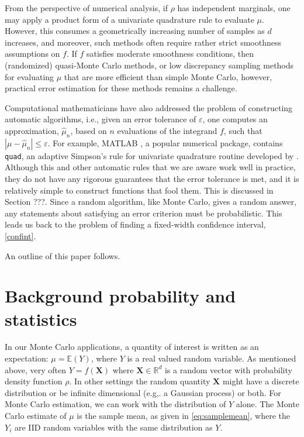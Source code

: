 \documentclass[graybox]{svmult}
\newcommand\real{\mathbb{R}}
\newcommand\e{\mathbb{E}}
\newcommand{\bsX}{\boldsymbol{X}}
\newcommand{\abs}[1]{\left|#1\right|}
\newcommand{\hmu}{\hat{\mu}}
\def\abs#1{\ensuremath{\left \lvert #1 \right \rvert}}
\begin{document}
From the perspective of numerical analysis, if $\rho$ has independent marginals, one may apply a product form of a univariate quadrature rule to evaluate $\mu$.  However, this consumes a geometrically increasing number of samples as $d$ increases, and moreover, such methods often require rather strict smoothness assumptions on $f$.  If $f$ satisfies moderate smoothness conditions, then (randomized) quasi-Monte Carlo methods, or low discrepancy sampling \citep{Nie92,SloJoe94,Lem09a,DicPil10a} methods for evaluating $\mu$ that are more efficient than simple Monte Carlo, however, practical error estimation for these methods remains a challenge.

Computational mathematicians have also addressed the problem of constructing automatic algorithms, i.e., given an error tolerance of $\varepsilon$, one computes an approximation, $\hmu_n$, based on $n$ evaluations of the integrand $f$, such that $\abs{\mu-\hmu_n} \le \varepsilon$. For example, MATLAB \citep{MAT7.12}, a popular numerical package, contains {\tt quad}, an adaptive Simpson's rule for univariate quadrature routine developed by \cite{GanGau00a}. Although this and other automatic rules that we are aware work well in practice, they do not have any rigorous guarantees that the error tolerance is met, and it is relatively simple to construct functions that fool them.  This is discussed in Section ???.  Since a random algorithm, like Monte Carlo, gives a random answer, any statements about satisfying an error criterion must be probabilistic.  This leads us back to the problem of finding a fixed-width confidence interval, \eqref{confint}.

An outline of this paper follows.




\section{Background probability and statistics}\label{sec:background}

In our Monte Carlo applications, a quantity of interest
is written as an expectation: $\mu = \e(Y)$, where $Y$
is a real valued random variable.  As mentioned above, very often
$Y = f(\bsX)$ where $\bsX\in\real^d$ is a random vector
with probability density function $\rho$. In other settings the random quantity $\bsX$ might
have a discrete distribution or be infinite dimensional (e.g,. a Gaussian
process) or both. For Monte Carlo estimation, we can
work with the distribution of $Y$ alone. The Monte Carlo estimate of $\mu$ is the sample mean, as given in \eqref{eq:samplemean}, where the $Y_i$ are IID random variables with the same distribution as $Y$.
\end{document}
